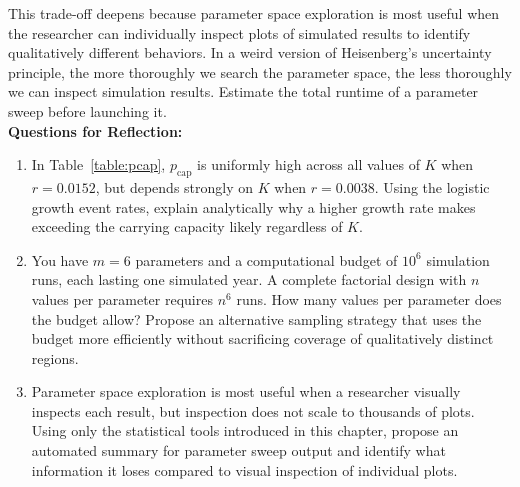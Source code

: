 This trade-off deepens because parameter space exploration is most useful when the researcher can individually inspect plots of simulated results to identify qualitatively different behaviors.
In a weird version of Heisenberg's uncertainty principle, the more thoroughly we search the parameter space, the less thoroughly we can inspect simulation results.
Estimate the total runtime of a parameter sweep before launching it.\\

\noindent \textup{{\bf Questions for Reflection:}}
\begin{enumerate}
\item In Table~\ref{table:pcap}, $p_{\text{cap}}$ is uniformly high across all values of $K$ when $r = 0.0152$, but depends strongly on $K$ when $r = 0.0038$. Using the logistic growth event rates, explain analytically why a higher growth rate makes exceeding the carrying capacity likely regardless of $K$.

\item You have $m = 6$ parameters and a computational budget of $10^6$ simulation runs, each lasting one simulated year. A complete factorial design with $n$ values per parameter requires $n^6$ runs. How many values per parameter does the budget allow? Propose an alternative sampling strategy that uses the budget more efficiently without sacrificing coverage of qualitatively distinct regions.

\item Parameter space exploration is most useful when a researcher visually inspects each result, but inspection does not scale to thousands of plots. Using only the statistical tools introduced in this chapter, propose an automated summary for parameter sweep output and identify what information it loses compared to visual inspection of individual plots.
\end{enumerate}
